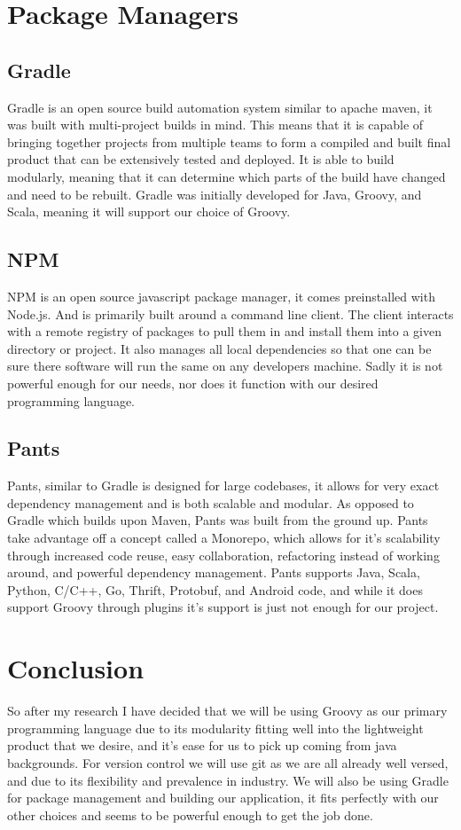 \documentclass[onecolumn, draftclsnofoot,10pt, compsoc]{IEEEtran}
\begin{document}
\section{Package Managers}
\subsection{Gradle}
Gradle is an open source build automation system similar to apache maven, it was built with multi-project builds in mind. This means that it is capable of bringing together projects from multiple teams to form a compiled and built final product that can be extensively tested and deployed. It is able to build modularly, meaning that it can determine which parts of the build have changed and need to be rebuilt. Gradle was initially developed for Java, Groovy, and Scala, meaning it will support our choice of Groovy.
\subsection{NPM}
NPM is an open source javascript package manager, it comes preinstalled with Node.js. And is primarily built around a command line client. The client interacts with a remote registry of packages to pull them in and install them into a given directory or project. It also manages all local dependencies so that one can be sure there software will run the same on any developers machine. Sadly it is not powerful enough for our needs, nor does it function with our desired programming language.
\subsection{Pants}
Pants, similar to Gradle is designed for large codebases, it allows for very exact dependency management and is both scalable and modular. As opposed to Gradle which builds upon Maven, Pants was built from the ground up. Pants take advantage off a concept called a Monorepo, which allows for it's scalability through increased code reuse, easy collaboration, refactoring instead of working around, and powerful dependency management. Pants supports Java, Scala, Python, C/C++, Go, Thrift, Protobuf, and Android code, and while it does support Groovy through plugins it's support is just not enough for our project.
\newpage
\section{Conclusion}
So after my research I have decided that we will be using Groovy as our primary programming language due to its modularity fitting well into the lightweight product that we desire, and it's ease for us to pick up coming from java backgrounds. For version control we will use git as we are all already well versed, and due to its flexibility and prevalence in industry. We will also be using Gradle for package management and building our application, it fits perfectly with our other choices and seems to be powerful enough to get the job done.
\end{document}

